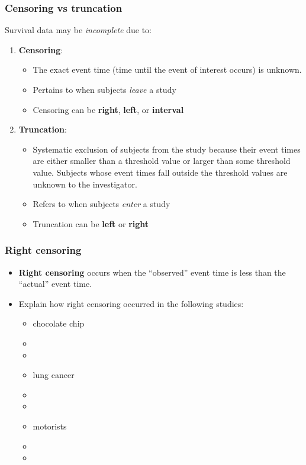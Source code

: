 \begin{frame}
\frametitle{Censoring vs truncation}
Survival data may be \emph{incomplete} due to:
\vskip10pt
\begin{enumerate}
\item  \textbf{Censoring}:
\begin{itemize}
\item The exact event time (time until the event of interest occurs) is unknown.
\item Pertains to when subjects \emph{leave} a study
\item Censoring can be \textbf{right}, \textbf{left}, or \textbf{interval}
\end{itemize}
\vskip10pt
\item \textbf{Truncation}:
\begin{itemize}
\item Systematic exclusion of subjects from the study because their event times are either smaller than a threshold value or larger than some threshold value. Subjects whose event times fall outside the threshold values are unknown to the investigator.
\item Refers to when subjects \emph{enter} a study
\item Truncation can be \textbf{left} or \textbf{right}
\end{itemize}
\end{enumerate}
\end{frame}

\begin{frame}
\frametitle{Right censoring}
\begin{itemize}
\item \textbf{Right censoring} occurs when the ``observed'' event time is less than the ``actual'' event time.
\item Explain how right censoring occurred in the following studies:
\begin{itemize}
\item chocolate chip
\item[] %
\item[]
\item lung cancer
\item[] %
\item[]
\item motorists
\item[] %
\item[]
\end{itemize}
\end{itemize}
\end{frame}



